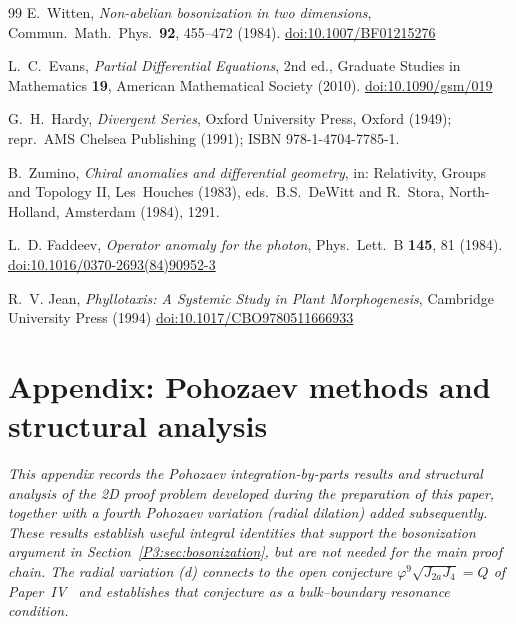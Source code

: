 \documentclass[11pt,a4paper]{article}
\theoremstyle{definition}
\theoremstyle{remark}
\newcommand{\vp}{\varphi}
\newcommand{\Ja}{J_{2a}}
\newcommand{\Jfour}{J_{4}}
\begin{document}
\begin{thebibliography}{99}
E.~Witten,
\textit{Non-abelian bosonization in two dimensions},
Commun.\ Math.\ Phys.\ \textbf{92}, 455--472 (1984).
\href{https://doi.org/10.1007/BF01215276}{doi:10.1007/BF01215276}

L.~C.~Evans,
\textit{Partial Differential Equations}, 2nd ed.,
Graduate Studies in Mathematics \textbf{19},
American Mathematical Society (2010).
\href{https://doi.org/10.1090/gsm/019}{doi:10.1090/gsm/019}

G.~H.~Hardy,
\textit{Divergent Series},
Oxford University Press, Oxford (1949); repr.\ AMS Chelsea Publishing (1991);
ISBN 978-1-4704-7785-1.


B.~Zumino,
\textit{Chiral anomalies and differential geometry},
in: Relativity, Groups and Topology II, Les~Houches (1983),
eds.\ B.S.~DeWitt and R.~Stora, North-Holland, Amsterdam (1984), 1291.

L.~D. Faddeev,
\textit{Operator anomaly for the photon},
Phys.\ Lett.\ B \textbf{145}, 81 (1984).
\href{https://doi.org/10.1016/0370-2693(84)90952-3}{doi:10.1016/0370-2693(84)90952-3}


R.~V. Jean,
\textit{Phyllotaxis: A Systemic Study in Plant Morphogenesis},
Cambridge University Press (1994)
\href{https://doi.org/10.1017/CBO9780511666933}{doi:10.1017/CBO9780511666933}


\end{thebibliography}


\appendix

\section*{Appendix: Pohozaev methods and structural analysis}

\emph{This appendix records the Pohozaev integration-by-parts results and
structural analysis of the 2D proof problem developed during the preparation
of this paper, together with a fourth Pohozaev variation (radial dilation)
added subsequently.  These results establish useful integral identities
that support the bosonization argument in Section~\ref{P3:sec:bosonization},
but are not needed for the main proof chain.
The radial variation (d) connects to the open conjecture
$\vp^9\sqrt{\Ja\Jfour}=Q$ of Paper~IV~\cite{Paper4} and establishes
that conjecture as a bulk--boundary resonance condition.}
\end{document}
